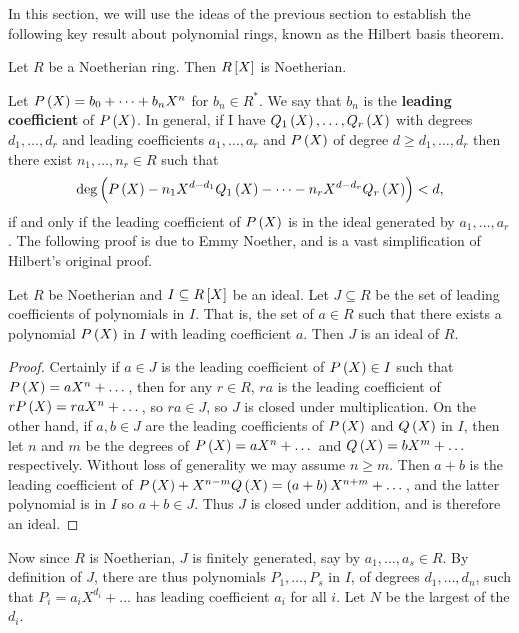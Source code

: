 In this section, we will use the ideas of the previous section to establish the following key result about polynomial rings, known as the Hilbert basis theorem.

\begin{theorem}
\label{thm:9.1.1}
Let $ R $ be a Noetherian ring. Then $ R\sbr{X} $ is Noetherian.
\end{theorem}


Let $ P\br{X} = b_0 + \dots + b_nX^n $ for $ b_n \in R^* $. We say that $ b_n $ is the \textbf{leading coefficient} of $ P\br{X} $. In general, if I have $ Q_1\br{X}, \dots, Q_r\br{X} $ with degrees $ d_1, \dots, d_r $ and leading coefficients $ a_1, \dots, a_r $ and $ P\br{X} $ of degree $ d \ge d_1, \dots, d_r $ then there exist $ n_1, \dots, n_r \in R $ such that
$$ \deg \br{P\br{X} - n_1X^{d - d_1}Q_1\br{X} - \dots - n_rX^{d - d_r}Q_r\br{X}} < d, $$
if and only if the leading coefficient of $ P\br{X} $ is in the ideal generated by $ a_1, \dots, a_r $. The following proof is due to Emmy Noether, and is a vast simplification of Hilbert's original proof.

\begin{lemma}
Let $ R $ be Noetherian and $ I \subseteq R\sbr{X} $ be an ideal. Let $ J \subseteq R $ be the set of leading coefficients of polynomials in $ I $. That is, the set of $ a \in R $ such that there exists a polynomial $ P\br{X} $ in $ I $ with leading coefficient $ a $. Then $ J $ is an ideal of $ R $.
\end{lemma}

\begin{proof}
Certainly if $ a \in J $ is the leading coefficient of $ P\br{X} \in I $ such that $ P\br{X} = aX^n + \dots $, then for any $ r \in R $, $ ra $ is the leading coefficient of $ rP\br{X} = raX^n + \dots $, so $ ra \in J $, so $ J $ is closed under multiplication. On the other hand, if $ a, b \in J $ are the leading coefficients of $ P\br{X} $ and $ Q\br{X} $ in $ I $, then let $ n $ and $ m $ be the degrees of $ P\br{X} = aX^n + \dots $ and $ Q\br{X} = bX^m + \dots $ respectively. Without loss of generality we may assume $ n \ge m $. Then $ a + b $ is the leading coefficient of $ P\br{X} + X^{n - m}Q\br{X} = \br{a + b}X^{n + m} + \dots $, and the latter polynomial is in $ I $ so $ a + b \in J $. Thus $ J $ is closed under addition, and is therefore an ideal.
\end{proof}

Now since $ R $ is Noetherian, $ J $ is finitely generated, say by $ a_1, \dots, a_s \in R $. By definition of $ J $, there are thus polynomials $ P_1, \dots, P_s $ in $ I $, of degrees $ d_1, \dots, d_n $, such that $ P_i = a_iX^{d_i} + \dots $ has leading coefficient $ a_i $ for all $ i $. Let $ N $ be the largest of the $ d_i $.

